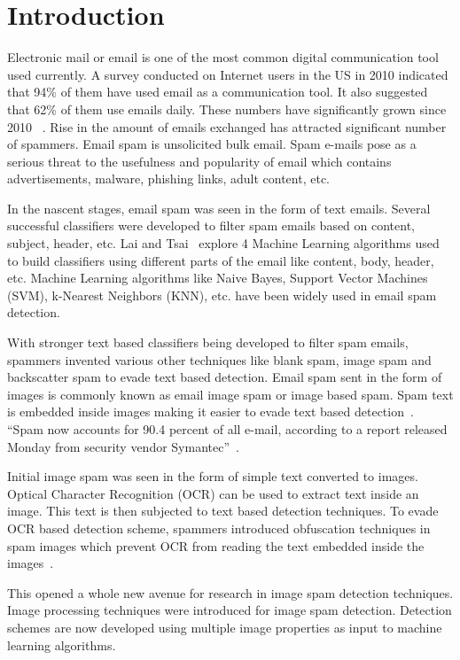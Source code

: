 \chapter{Introduction}

Electronic mail or email is one of the most common digital communication tool used currently. A survey conducted on Internet users in the US in 2010 indicated that 94\% of them have used email as a communication tool. It also suggested that 62\% of them use emails daily. These numbers have significantly grown since 2010~\cite{1} . Rise in the amount of emails exchanged has attracted significant number of spammers. Email spam is unsolicited bulk email. Spam e-mails pose as a serious threat to the usefulness and popularity of email which contains advertisements, malware, phishing links, adult content, etc. 

\par In the nascent stages, email spam was seen in the form of text emails. Several successful classifiers were developed to filter spam emails based on content, subject, header, etc. Lai and Tsai~\cite{2} explore 4 Machine Learning algorithms used to build classifiers using different parts of the email like content, body, header, etc. Machine Learning algorithms like Naive Bayes, Support Vector Machines (SVM), k-Nearest Neighbors (KNN), etc. have been widely used in email spam detection.

\par With stronger text based classifiers being developed to filter spam emails, spammers invented various other techniques like blank spam, image spam and backscatter spam to evade text based detection. Email spam sent in the form of images is commonly known as email image spam or image based spam. Spam text is embedded inside images making it easier to evade text based detection~\cite{3}. ``Spam now accounts for 90.4 percent of all e-mail, according to a report released Monday from security vendor Symantec''~\cite{4}. 

\par Initial image spam was seen in the form of simple text converted to images. Optical Character Recognition (OCR) can be used to extract text inside an image. This text is then subjected to text based detection techniques. To evade OCR based detection scheme, spammers introduced obfuscation techniques in spam images which prevent OCR from reading the text embedded inside the images~\cite{5}. 

\par This opened a whole new avenue for research in image spam detection techniques. Image processing techniques were introduced for image spam detection. Detection schemes are now developed using multiple image properties as input to machine learning algorithms. 

